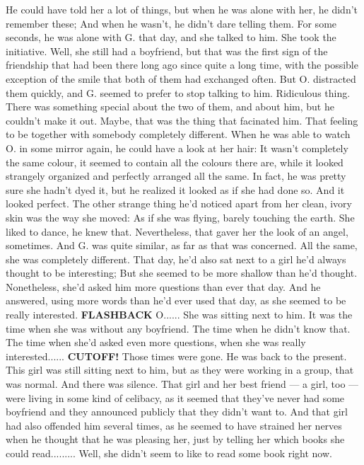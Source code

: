 He could have told her a lot of things, but when he was alone with her, he didn't remember these; And when he wasn't, he didn't dare telling them. 
For some seconds, he was alone with G. that day, and she talked to him. 
She took the initiative. 
Well, she still had a boyfriend, but that was the first sign of the friendship that had been there long ago since quite a long time, with the possible exception of the smile that both of them had exchanged often. 
But O. distracted them quickly, and G. seemed to prefer to stop talking to him. 
Ridiculous thing. There was something special about the two of them, and about him, but he couldn't make it out. 
Maybe, that was the thing that facinated him. 
That feeling to be together with somebody completely different. 
When he was able to watch O. in some mirror again, he could have a look at her hair: It wasn't completely the same colour, it seemed to contain all the colours there are, while it looked strangely organized and perfectly arranged all the same. In fact, he was pretty sure she hadn't dyed it, but he realized it looked as if she had done so. 
And it looked perfect. 
The other strange thing he'd noticed apart from her clean, ivory skin was the way she moved: As if she was flying, barely touching the earth. 
She liked to dance, he knew that. 
Nevertheless, that gaver her the look of an angel, sometimes. 
And G. was quite similar, as far as that was concerned. 
All the same, she was completely different. 
That day, he'd also sat next to a girl he'd always thought to be interesting; But she seemed to be more shallow than he'd thought. 
Nonetheless, she'd asked him more questions than ever that day. 
And he answered, using more words than he'd ever used that day, as she seemed to be really interested. 
\textbf{FLASHBACK}
O......
She was sitting next to him. 
It was the time when she was without any boyfriend. 
The time when he didn't know that. 
The time when she'd asked even more questions, when she was really interested......
\textbf{CUTOFF!}
Those times were gone. 
He was back to the present. 
This girl was still sitting next to him, but as they were working in a group, that was normal. 
And there was silence. 
That girl and her best friend --- a girl, too --- were living in some kind of celibacy, as it seemed that they've never had some boyfriend and they announced publicly that they didn't want to. 
And that girl had also offended him several times, as he seemed to have strained her nerves when he thought that he was pleasing her, just by telling her which books she could read.........
Well, she didn't seem to like to read some book right now. 

